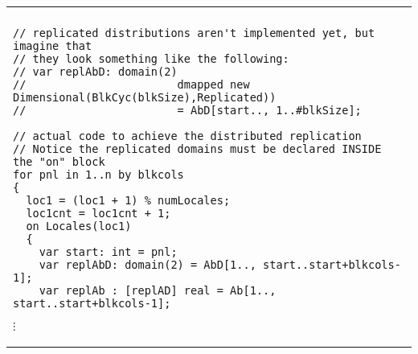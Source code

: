 \centering
\scriptsize
\begin{tabular}{| m{13cm} |}
\hline\\
\begin{verbatim}
// replicated distributions aren't implemented yet, but imagine that
// they look something like the following:
// var replAbD: domain(2)
//                       dmapped new Dimensional(BlkCyc(blkSize),Replicated))
//                       = AbD[start.., 1..#blkSize];

// actual code to achieve the distributed replication
// Notice the replicated domains must be declared INSIDE the "on" block
for pnl in 1..n by blkcols
{
  loc1 = (loc1 + 1) % numLocales;
  loc1cnt = loc1cnt + 1;
  on Locales(loc1)
  {
    var start: int = pnl;
    var replAbD: domain(2) = AbD[1.., start..start+blkcols-1];
    var replAb : [replAD] real = Ab[1.., start..start+blkcols-1];

\end{verbatim}
\centering
 $\vdots$
\end{tabular}